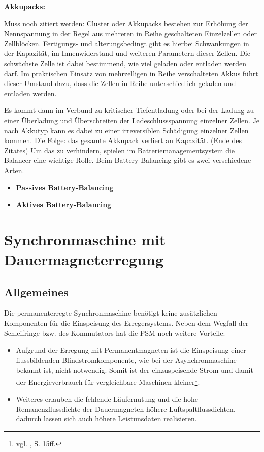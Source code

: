 \textbf{Akkupacks:}

Muss noch zitiert werden: Cluster oder Akkupacks bestehen zur Erhöhung der Nennspannung in der Regel aus mehreren in Reihe geschalteten Einzelzellen oder Zellblöcken. Fertigungs- und alterungsbedingt gibt es hierbei Schwankungen in der Kapazität, im Innenwiderstand und weiteren Parametern dieser Zellen. Die schwächste Zelle ist dabei bestimmend, wie viel geladen oder entladen werden darf. Im praktischen Einsatz von mehrzelligen in Reihe verschalteten Akkus führt dieser Umstand dazu, dass die Zellen in Reihe unterschiedlich geladen und entladen werden.

Es kommt dann im Verbund zu kritischer Tiefentladung oder bei der Ladung zu einer Überladung und Überschreiten der Ladeschlussspannung einzelner Zellen. Je nach Akkutyp kann es dabei zu einer irreversiblen Schädigung einzelner Zellen kommen. Die Folge: das gesamte Akkupack verliert an Kapazität. (Ende des Zitates)
Um das zu verhindern, spielen im Batteriemanagementsystem die Balancer eine wichtige Rolle. Beim Battery-Balancing gibt es zwei verschiedene Arten. 
\begin{itemize}
\item \textbf{Passives Battery-Balancing} \medskip\\
\item \textbf{Aktives Battery-Balancing} \medskip\\
\end{itemize}

\newpage

\section{Synchronmaschine mit Dauermagneterregung}
\subsection{Allgemeines}
Die permanenterregte Synchronmaschine benötigt keine zusätzlichen Komponenten für die Einspeisung des Erregersystems. Neben dem Wegfall der Schleifringe bzw. des Kommutators hat die PSM noch weitere Vorteile:
\\[5mm]
\begin{itemize}
	\item Aufgrund der Erregung mit Permanentmagneten ist die Einspeisung einer flussbildenden Blindstromkomponente, wie bei der Asynchronmaschine bekannt ist, nicht notwendig. Somit ist der einzuspeisende Strom und damit der Energieverbrauch für vergleichbare Maschinen kleiner\footnote{vgl. \cite{Dissertation}, S. 15ff.}. \\[3mm]
	\item Weiteres erlauben die fehlende Läufernutung und die hohe Remanenzflussdichte der Dauermagneten höhere Luftspaltflussdichten, dadurch lassen sich auch höhere Leistunsdaten realisieren. \\[3mm]
\end{itemize}

